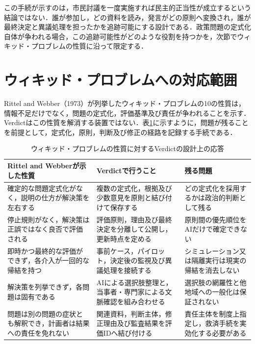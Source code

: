 この手続が示すのは，市民討議を一度実施すれば民主的正当性が成立するという結論ではない．誰が参加し，どの資料を読み，発言がどの原則へ変換され，誰が最終決定と異議処理を担ったかを追跡可能にする設計である．政策問題の定式化自体が争われる場合，この追跡可能性がどのような役割を持つかを，次節でウィキッド・プロブレムの性質に沿って限定する．

\section{ウィキッド・プロブレムへの対応範囲}

Rittel and Webber（1973）が列挙したウィキッド・プロブレムの10の性質は，情報不足だけでなく，問題の定式化，評価基準及び責任が争われることを示す\cite{rittel1973}．Verdictはこの性質を解消する装置ではない．表\ref{tab:ch7_wicked_response}に示すように，問題が残ることを前提として，定式化，原則，判断及び修正の経路を記録する手続である．

\begin{table}[htb]
\caption{ウィキッド・プロブレムの性質に対するVerdictの設計上の応答}
\label{tab:ch7_wicked_response}
\centering
\small
\begin{tabularx}{\columnwidth}{p{}p{}X}
\toprule
Rittel and Webberが示した性質 & Verdictで行うこと & 残る問題 \\
\midrule
確定的な問題定式化がなく，説明の仕方が解決策を左右する & 複数の定式化，根拠及び少数意見を原則と結び付けて保存する & どの定式化を採用するかは政治的判断として残る \\
停止規則がなく，解決策は正誤ではなく良否で評価される & 評価原則，理由及び最終決定を分離して公開し，更新時点を定める & 原則間の優先順位をAIだけで確定できない \\
即時かつ最終的な評価ができず，各介入が一回的な帰結を持つ & 事前ケース，パイロット，決定後の監視及び異議処理を接続する & シミュレーション又は隔離実行は現実の帰結を消去しない \\
解決策を列挙できず，各問題は固有である & AIによる選択肢整理と，当事者・専門家による文脈確認を組み合わせる & 選択肢の網羅性と他地域への一般化は保証されない \\
問題は別の問題の症状とも解釈でき，計画者は結果への責任を免れない & 関連資料，判断主体，修正理由及び監査結果を評価IDへ結び付ける & 責任主体を制度上指定し，救済手続を実効化する必要がある \\
\bottomrule
\end{tabularx}
\end{table}

